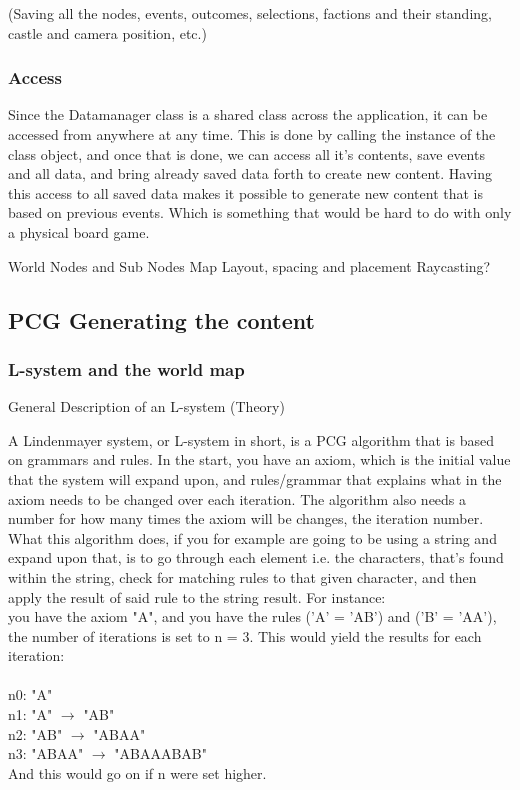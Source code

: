(Saving all the nodes, events, outcomes, selections, factions and their standing, castle and camera position, etc.)

\subsubsection{Access}
	
Since the Datamanager class is a shared class across the application, it can be accessed from anywhere at any time. This is done by calling the instance of the class object, and once that is done, we can access all it's contents, save events and all data, and bring already saved data forth to create new content. Having this access to all saved data makes it possible to generate new content that is based on previous events. Which is something that would be hard to do with only a physical board game. 	


World Nodes and Sub Nodes
Map Layout, spacing and placement
Raycasting?
\subsection{PCG Generating the content}
\subsubsection{L-system and the world map}
General Description of an L-system (Theory)

A Lindenmayer system, or L-system in short, is a PCG algorithm that is based on grammars and rules. In the start, you have an axiom, which is the initial value that the system will expand upon, and rules/grammar that explains what in the axiom needs to be changed over each iteration. The algorithm also needs a number for how many times the axiom will be changes, the iteration number. What this algorithm does, if you for example are going to be using a string and expand upon that, is to go through each element i.e. the characters, that's found within the string, check for matching rules to that given character, and then apply the result of said rule to the string result. 
For instance:
\\ you have the axiom "A", and you have the rules ('A' = 'AB') and ('B' = 'AA'), the number of iterations is set to n = 3. This would yield the results for each iteration:\\\\
n0: "A"\\
n1: "A" $\rightarrow$  "AB"\\
n2: "AB"  $\rightarrow$ "ABAA"\\
n3: "ABAA"  $\rightarrow$  "ABAAABAB"\\
And this would go on if n were set higher.\\

